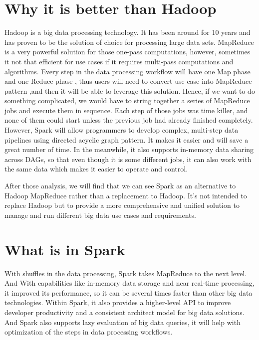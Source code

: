 \documentclass[sigconf]{acmart}
\begin{document}
\section{Why it is better than Hadoop}
Hadoop is a big data processing technology. It has been around for 10 years and has proven to be the solution of choice for processing large data sets. MapReduce is a very powerful solution for those one-pass computations, however, sometimes it not that efficient for use cases if it requires multi-pass computations and algorithms. Every step in the data processing workflow will have one Map phase and one Reduce phase , thus users will need to convert use case into MapReduce pattern ,and then it will be able to leverage this solution.
Hence, if we want to do something complicated, we would have to string together a series of MapReduce jobs and execute them in sequence. Each step of those jobs was time killer, and none of them could start unless the previous job had already finished completely.
However, Spark will allow programmers to develop complex, multi-step data pipelines using directed acyclic graph pattern. It makes it easier and will save a great number of time. In the meanwhile, it also supports in-memory data sharing across DAGs, so that even though it is some different jobs, it can also work with the same data which makes it easier to operate and control.

After those analysis, we will find that we can see Spark as an alternative to Hadoop MapReduce rather than a replacement to Hadoop. It’s not intended to replace Hadoop but to provide a more comprehensive and unified \cite{Zaharia:2016:ASU:3013530.2934664,} solution to manage and run different big data use cases and requirements.



\section{What is in Spark}
With shuffles in the data processing, Spark takes MapReduce to the next level. And
With capabilities like in-memory data storage and near real-time processing, it improved its performance\cite{Armbrust:2015:SSR:2824032.2824080,}, so it can be several times faster than other big data technologies.
Within Spark, it also provides a higher-level API to improve developer productivity and a consistent architect model for big data solutions. And Spark also supports lazy evaluation of big data queries, it will help with optimization of the steps in data processing workflows.
\end{document}
